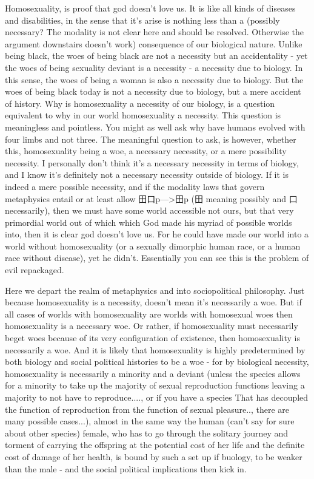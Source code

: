 Homosexuality, is proof that god doesn’t love us. It is like all kinds of diseases and disabilities, in the sense that it’s arise is nothing less than a (possibly necessary? The modality is not clear here and should be resolved. Otherwise the argument downstairs doesn’t work) consequence of our biological nature. Unlike being black, the woes of being black are not a necessity but an accidentality - yet the woes of being sexuality deviant is a necessity - a necessity due to biology. In this sense, the woes of being a woman is also a necessity due to biology. But the woes of being black today is not a necessity due to biology, but a mere accident of history. Why is homosexuality a necessity of our biology, is a question equivalent to why in our world homosexuality a necessity. This question is meaningless and pointless. You might as well ask why have humans evolved with four limbs and not three. The meaningful question to ask, is however, whether this, homosexuality being a woe, a necessary necessity, or a mere possibility necessity. I personally don’t think it’s a necessary necessity in terms of biology, and I know it’s definitely not a necessary necessity outside of biology. If it is indeed a mere possible necessity, and if the modality laws that govern metaphysics entail or at least allow 田口p—>田p (田 meaning possibly and 口 necessarily), then we must have some world accessible not ours, but that very primordial world out of which which God made his myriad of possible worlds into, then it is clear god doesn’t love us. For he could have made our world into a world without homosexuality (or a sexually dimorphic human race, or a human race without disease), yet he didn’t. Essentially you can see this is the problem of evil repackaged. 

Here we depart the realm of metaphysics and into sociopolitical philosophy. Just because homosexuality is a necessity, doesn’t mean it’s necessarily a woe. But if all cases of worlds with homosexuality are worlds with homosexual woes then homosexuality is a necessary woe. Or rather, if homosexuality must necessarily beget woes because of its very configuration of existence, then homosexuality is necessarily a woe. And it is likely that homosexuality is highly predetermined by both biology and social political histories to be a woe - for by biological necessity, homosexuality is necessarily a minority and a deviant (unless the species allows for a minority to take up the majority of sexual reproduction functions leaving a majority to not have to reproduce...., or if you have a species That has decoupled the function of reproduction from the function of sexual pleasure.., there are many possible cases...), almost in the same way the human (can’t say for sure about other species) female, who has to go through the solitary journey and torment of carrying the offspring at the potential cost of her life and the definite cost of damage of her health, is bound by such a set up if buology, to be weaker than the male - and the social political implications then kick in. 

